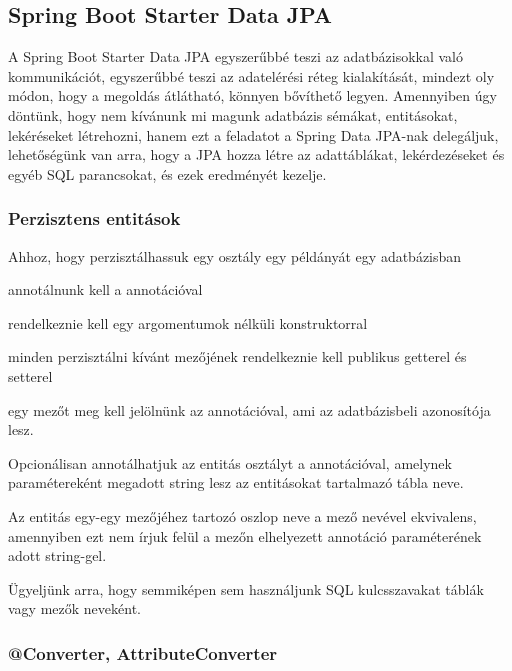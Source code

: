 \subsection{Spring Boot Starter Data JPA}

A Spring Boot Starter Data JPA egyszerűbbé teszi az adatbázisokkal való kommunikációt, egyszerűbbé teszi az adatelérési réteg kialakítását, mindezt oly módon, hogy a megoldás átlátható, könnyen bővíthető legyen. Amennyiben úgy döntünk, hogy nem kívánunk mi magunk adatbázis sémákat, entitásokat, lekéréseket létrehozni, hanem ezt a feladatot a Spring Data JPA-nak delegáljuk, lehetőségünk van arra, hogy a JPA hozza létre az adattáblákat, lekérdezéseket és egyéb SQL parancsokat, és ezek eredményét kezelje.

\subsubsection{Perzisztens entitások}

Ahhoz, hogy perzisztálhassuk egy osztály egy példányát egy adatbázisban 

\begin{listing}
	\item annotálnunk kell a  annotációval
	\item rendelkeznie kell egy argomentumok nélküli konstruktorral
	\item minden perzisztálni kívánt mezőjének rendelkeznie kell publikus getterel és setterel
	\item egy mezőt meg kell jelölnünk az  annotációval, ami az adatbázisbeli azonosítója lesz.
\end{listing}

Opcionálisan annotálhatjuk az entitás osztályt a  annotációval, amelynek  paramétereként megadott string lesz az entitásokat tartalmazó tábla neve. \par

Az entitás egy-egy mezőjéhez tartozó oszlop neve a mező nevével ekvivalens, amennyiben ezt nem írjuk felül a mezőn elhelyezett  annotáció  paraméterének adott string-gel. \par

Ügyeljünk arra, hogy semmiképen sem használjunk SQL kulcsszavakat táblák vagy mezők neveként.

\subsubsection{@Converter, AttributeConverter}

